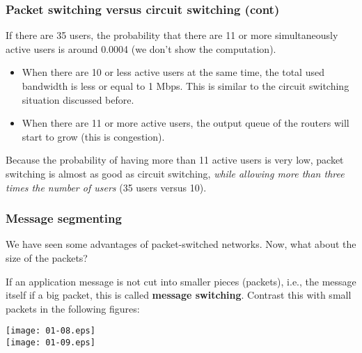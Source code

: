 %
\begin{frame}
\frametitle{Packet switching versus circuit switching (cont)}

If there are 35 users, the probability that there are 11 or more
simultaneously active users is around 0.0004 (we don't show the
computation).
\begin{itemize}

  \item When there are 10 or less active users at the same time, the
  total used bandwidth is less or equal to 1 Mbps. This is similar to
  the circuit switching situation discussed before.

  \item When there are 11 or more active users, the output queue of
  the routers will start to grow (this is congestion).

\end{itemize}

Because the probability of having more than 11 active users is very
low, packet switching is almost as good as circuit switching,
\emph{while allowing more than three times the number of users} (35
users versus 10).

\end{frame}

%
\begin{frame}
\frametitle{Message segmenting}

We have seen some advantages of packet-switched networks. Now, what
about the size of the packets?

\bigskip

If an application message is not cut into smaller pieces (packets),
i.e., the message itself if a big packet, this is called
\textbf{message switching}. Contrast this with small packets in the
following figures:
\begin{center}
\texttt{[image: 01-08.eps]}\\
\texttt{[image: 01-09.eps]}
\end{center}

\end{frame}

